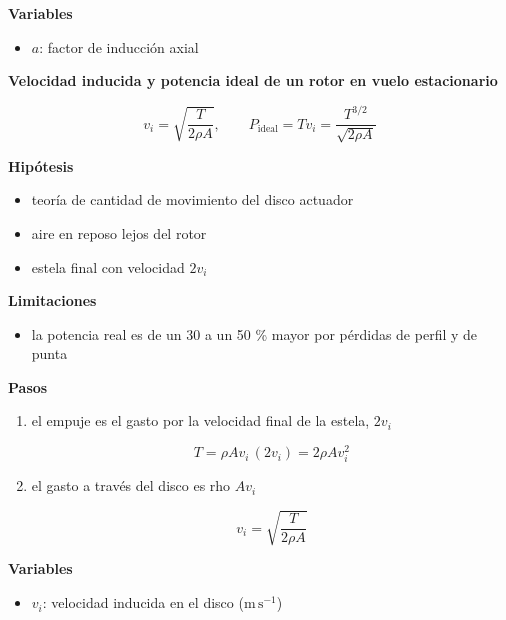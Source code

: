 \documentclass[10pt,openany]{book}
\begin{document}
\begin{tcolorbox}[title={Desarrollos del modelo}, studiumdef, breakable]
\noindent\textbf{Variables}
\begin{itemize}
\item $a$: factor de inducción axial
\end{itemize}



\noindent\textbf{Velocidad inducida y potencia ideal de un rotor en vuelo estacionario}

\begin{equation}
v_i = \sqrt{\frac{T}{2\rho A}},\qquad P_{\mathrm{ideal}} = T v_i = \frac{T^{3/2}}{\sqrt{2\rho A}}
\label{eq:c09-hover}
\end{equation}

\noindent\textbf{Hipótesis}
\begin{itemize}
\item teoría de cantidad de movimiento del disco actuador
\item aire en reposo lejos del rotor
\item estela final con velocidad \(2 v_i\)
\end{itemize}

\noindent\textbf{Limitaciones}
\begin{itemize}
\item la potencia real es de un 30 a un 50 \% mayor por pérdidas de perfil y de punta
\end{itemize}

\noindent\textbf{Pasos}
\begin{enumerate}
\item
el empuje es el gasto por la velocidad final de la estela, \(2 v_i\)

\[
T = \rho A v_i\,(2 v_i) = 2\rho A v_i^{2}
\]
\item
el gasto a través del disco es rho \(A v_i\)

\[
v_i = \sqrt{\frac{T}{2\rho A}}
\]
\end{enumerate}

\noindent\textbf{Variables}
\begin{itemize}
\item $v_{i}$: velocidad inducida en el disco ($\mathrm{m}\,\mathrm{s}^{-1}$)
\end{itemize}


\end{tcolorbox}
\end{document}
